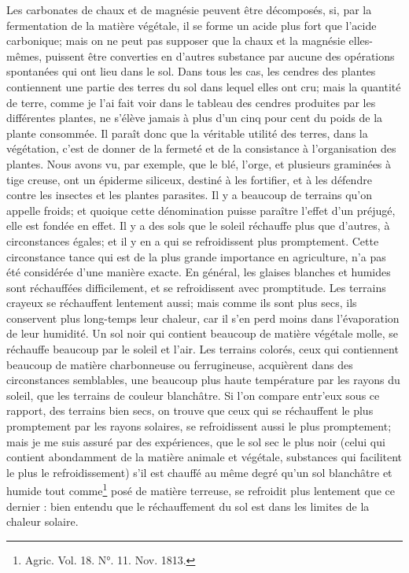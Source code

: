 Les carbonates de chaux et de magnésie\setcounter{page}{442} peuvent être décomposés, si, par la fermentation de la matière végétale, il se forme un acide plus fort que l'acide carbonique; mais on ne peut pas supposer que la chaux et la magnésie elles-mêmes, puissent être converties en d'autres substance par aucune des opérations spontanées qui ont lieu dans le sol. Dans tous les cas, les cendres des plantes contiennent une partie des terres du sol dans lequel elles ont cru; mais la quantité de terre, comme je l'ai fait voir dans le tableau des cendres produites par les différentes plantes, ne s'élève jamais à plus d'un cinq pour cent du poids de la plante consommée. Il paraît donc que la véritable utilité des terres, dans la végétation, c'est de donner de la fermeté et de la consistance à l'organisation des plantes. Nous avons vu, par exemple, que le blé, l'orge, et plusieurs graminées à tige creuse, ont un épiderme siliceux, destiné à les fortifier, et à les défendre contre les insectes et les plantes parasites. Il y a beaucoup de terrains qu'on appelle froids; et quoique cette dénomination puisse paraître l'effet d'un préjugé, elle est fondée en effet. Il y a des sols que le soleil réchauffe plus que d'autres, à circonstances égales; et il y en a qui se refroidissent plus promptement. Cette circonstance\setcounter{page}{443} tance qui est de la plus grande importance en agriculture, n'a pas été considérée d'une manière exacte. En général, les glaises blanches et humides sont réchauffées difficilement, et se refroidissent avec promptitude. Les terrains crayeux se réchauffent lentement aussi; mais comme ils sont plus secs, ils conservent plus long-temps leur chaleur, car il s'en perd moins dans l'évaporation de leur humidité. Un sol noir qui contient beaucoup de matière végétale molle, se réchauffe beaucoup par le soleil et l'air. Les terrains colorés, ceux qui contiennent beaucoup de matière charbonneuse ou ferrugineuse, acquièrent dans des circonstances semblables, une beaucoup plus haute température par les rayons du soleil, que les terrains de couleur blanchâtre. Si l'on compare entr'eux sous ce rapport, des terrains bien secs, on trouve que ceux qui se réchauffent le plus promptement par les rayons solaires, se refroidissent aussi le plus promptement; mais je me suis assuré par des expériences, que le sol sec le plus noir (celui qui contient abondamment de la matière animale et végétale, substances qui facilitent le plus le refroidissement) s'il est chauffé au même degré qu'un sol blanchâtre et humide tout comme\footnote{Agric. Vol. 18. N°. 11. Nov. 1813.}\setcounter{page}{444} posé de matière terreuse, se refroidit plus lentement que ce dernier : bien entendu que le réchauffement du sol est dans les limites de la chaleur solaire.
